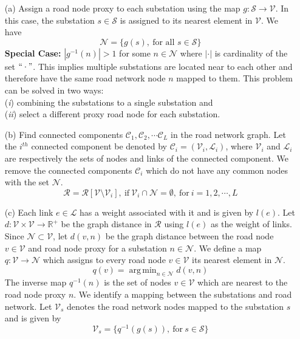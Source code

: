 \documentclass[12pt]{article}
\DeclareMathOperator*{\argmin}{arg\,min}
\begin{document}
	\begin{enumerate}
		\item[(a)] Assign a road node proxy to each substation using the map $g:\mathcal{S}\rightarrow \mathcal{V}$. In this case, the substation $s\in\mathcal{S}$ is assigned to its nearest element in $\mathcal{V}$. We have
		\begin{equation}\mathcal{N}=\{g(s),\ \textrm{for all }s\in\mathcal{S}\}\end{equation} 
		\textbf{Special Case:} $|g^{-1}(n)|>1$ for some $n\in\mathcal{N}$ where $|\cdot|$ is cardinality of the set $``\cdot"$. This implies multiple substations are located near to each other and therefore have the same road network node $n$ mapped to them. This problem can be solved in two ways:\\
		(\textit{i}) combining the substations to a single substation and\\
		(\textit{ii}) select a different proxy road node for each substation.
		\item[(b)] Find connected components $\mathcal{C}_1,\mathcal{C}_2,\cdots\mathcal{C}_L$ in the road network graph. Let the $i^{th}$ connected component be denoted by $\mathcal{C}_i=(\mathcal{V}_i,\mathcal{L}_i)$, where $\mathcal{V}_i$ and $\mathcal{L}_i$ are respectively the sets of nodes and links of the connected component. We remove the connected components $\mathcal{C}_i$ which do not have any common nodes with the set $\mathcal{N}$. 
		\begin{equation}\mathcal{R}=\mathcal{R}[\mathcal{V}\setminus\mathcal{V}_i],\ \textrm{if}\ \mathcal{V}_i\cap\mathcal{N}=\emptyset,\ \textrm{for}\ i=1,2,\cdots,L\end{equation}
		\item[(c)] Each link $e\in\mathcal{L}$ has a weight associated with it and is given by $l(e)$. Let $d:\mathcal{V}\times\mathcal{V}\rightarrow\mathbb{R}^{+}$ be the graph distance in $\mathcal{R}$ using $l(e)$ as the weight of links. Since $\mathcal{N}\subset\mathcal{V}$, let $d(v,n)$ be the graph distance between the road node $v\in\mathcal{V}$ and road node proxy for a substation $n\in\mathcal{N}$. We define a map $q:\mathcal{V}\rightarrow\mathcal{N}$ which assigns to every road node $v\in\mathcal{V}$ its nearest element in $\mathcal{N}$.
		\begin{equation}q(v)=\argmin_{n\in\mathcal{N}}{d(v,n)}\end{equation}
		The inverse map $q^{-1}(n)$ is the set of nodes $v\in\mathcal{V}$ which are nearest to the road node proxy $n$.	We identify a mapping between the substations and road network. Let $\mathcal{V}_s$ denotes the road network nodes mapped to the substation $s$ and is given by
		\begin{equation}\mathcal{V}_s=\{q^{-1}(g(s)),\ \textrm{for}\ s\in\mathcal{S}\}\end{equation}
		

\end{enumerate}
\end{document}
